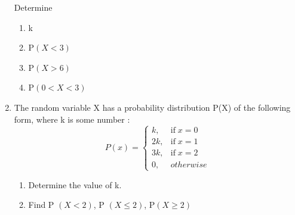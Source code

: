 \begin{enumerate}[label=\thesection.\arabic*,ref=\thesection.\theenumi]
Determine

\begin{enumerate}
\begin{table}[ht!]\centering

\end{table}
\item k
\item P$(X < 3)$
\item P$(X > 6)$
\item P$(0 < X < 3)$

\end{enumerate}

\item The random variable X has a probability distribution P(X) of the following form,
where k is some number :
\[P(x)=\begin{cases}
k, & \mbox{if}\; x= 0\\
2k, & \mbox{if}\; x= 1\\
3k, & \mbox{if}\; x= 2\\
0, & otherwise
\end{cases}\]
\begin{enumerate}
\item Determine the value of k.
\item Find P $(X < 2)$, P $(X \leq 2)$, P$(X \geq 2)$
\end{enumerate}
    \end{enumerate}
